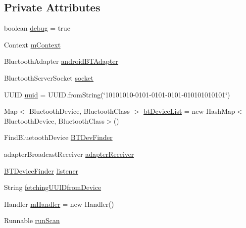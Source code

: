 \subsection*{Private Attributes}
\begin{DoxyCompactItemize}
\item 
boolean \hyperlink{classcs_1_1usense_1_1bluetooth_1_1_b_t_manager_a82ed52e2ad49e81104984257a21a24d4}{debug} = true
\item 
Context \hyperlink{classcs_1_1usense_1_1bluetooth_1_1_b_t_manager_abd0ee7affd39e2c98ec93d60c00d72ad}{m\+Context}
\item 
Bluetooth\+Adapter \hyperlink{classcs_1_1usense_1_1bluetooth_1_1_b_t_manager_ab723a5668db796334a5568239a12dd7c}{android\+B\+T\+Adapter}
\item 
Bluetooth\+Server\+Socket \hyperlink{classcs_1_1usense_1_1bluetooth_1_1_b_t_manager_a28cdfcd55e5eb8100696324bdde40ccc}{socket}
\item 
U\+U\+I\+D \hyperlink{classcs_1_1usense_1_1bluetooth_1_1_b_t_manager_a15181a6e41bb0031cded5d0888074c73}{uuid} = U\+U\+I\+D.\+from\+String(\char`\"{}10101010-\/0101-\/0101-\/0101-\/010101010101\char`\"{})
\item 
Map$<$ Bluetooth\+Device, Bluetooth\+Class $>$ \hyperlink{classcs_1_1usense_1_1bluetooth_1_1_b_t_manager_ac01ae1f551a056f0cbf7feee7b353608}{bt\+Device\+List} = new Hash\+Map$<$Bluetooth\+Device, Bluetooth\+Class$>$()
\item 
Find\+Bluetooth\+Device \hyperlink{classcs_1_1usense_1_1bluetooth_1_1_b_t_manager_ac1045a31137eac95b1e8538258e3d56b}{B\+T\+Dev\+Finder}
\item 
adapter\+Broadcast\+Receiver \hyperlink{classcs_1_1usense_1_1bluetooth_1_1_b_t_manager_a64744011b97a36325b6f8f3040a8afe3}{adapter\+Receiver}
\item 
\hyperlink{interfacecs_1_1usense_1_1bluetooth_1_1_b_t_device_finder}{B\+T\+Device\+Finder} \hyperlink{classcs_1_1usense_1_1bluetooth_1_1_b_t_manager_a7210126f7a9be3ab7bc154a0526c18ad}{listener}
\item 
String \hyperlink{classcs_1_1usense_1_1bluetooth_1_1_b_t_manager_ad6f34da89d1e49ac447a664e494e9f80}{fetching\+U\+U\+I\+Dfrom\+Device}
\item 
Handler \hyperlink{classcs_1_1usense_1_1bluetooth_1_1_b_t_manager_a34f0247df92d1f695334948e7f5a064a}{m\+Handler} = new Handler()
\item 
Runnable \hyperlink{classcs_1_1usense_1_1bluetooth_1_1_b_t_manager_a92284865c642201dbf7a1a30458ee035}{run\+Scan}
\end{DoxyCompactItemize}
